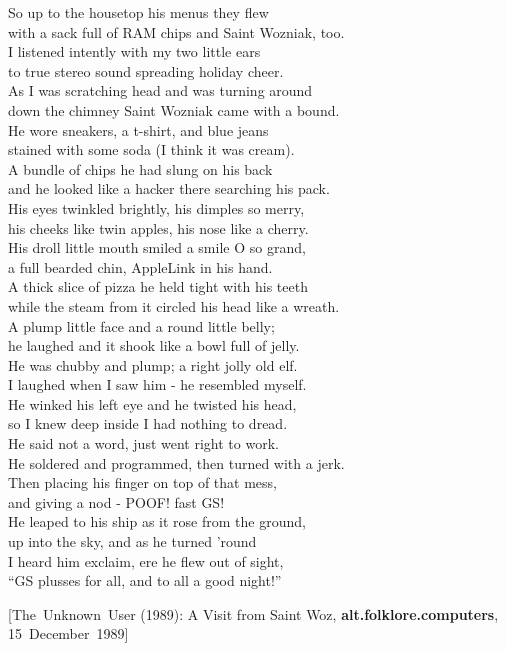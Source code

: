 \documentclass{report}
\newcommand{\citeusenet}[7]
{\hfill{\rmfamily\footnotesize[\mbox{#1} (#3): #4, {\bfseries#5}, \mbox{#7 #3}]}}
\newenvironment{usenet}{\begin{addmargin}{0.5in}\raggedright\small\ttfamily}{\rmfamily\end{addmargin}}
\begin{document}
\begin{usenet}
		So up to the housetop his menus they flew\\
		with a sack full of RAM chips and Saint Wozniak, too.\\
		I listened intently with my two little ears\\
		to true stereo sound spreading holiday cheer.\\
		As I was scratching head and was turning around\\
		down the chimney Saint Wozniak came with a bound.\\
		He wore sneakers, a t-shirt, and blue jeans\\
		stained with some soda (I think it was cream).\\
		A bundle of chips he had slung on his back\\
		and he looked like a hacker there searching his pack.\\
		His eyes twinkled brightly, his dimples so merry,\\
		his cheeks like twin apples, his nose like a cherry.\\
		His droll little mouth smiled a smile O so grand,\\
		a full bearded chin, AppleLink in his hand.\\
		A thick slice of pizza he held tight with his teeth\\
		while the steam from it circled his head like a wreath.\\
		A plump little face and a round little belly;\\
		he laughed and it shook like a bowl full of jelly.\\
		He was chubby and plump; a right jolly old elf.\\
		I laughed when I saw him - he resembled myself.\\
		He winked his left eye and he twisted his head,\\
		so I knew deep inside I had nothing to dread.\\
		He said not a word, just went right to work.\\
		He soldered and programmed, then turned with a jerk.\\
		Then placing his finger on top of that mess,\\
		and giving a nod - POOF! fast GS!\\
		He leaped to his ship as it rose from the ground,\\
		up into the sky, and as he turned 'round\\
		I heard him exclaim, ere he flew out of sight,\\
		``GS plusses for all, and to all a good night!''

		\citeusenet{The Unknown User}{unknown@ucscb.ucsc.edu}{1989}{A Visit from Saint Woz}{alt.folklore.computers}{\_mXEGBQNF\_A}
			{15 December}
	\end{usenet}
\end{document}
